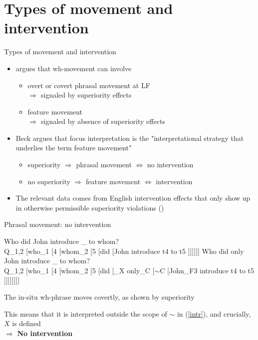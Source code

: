 \documentclass[11pt,final,hyperref={pdfpagelabels=false}]{beamer}
\begin{document}
\section{Types of movement and intervention}
\begin{frame}{Types of movement and intervention}

\begin{itemize}
\item \cite{Pes00} argues that wh-movement can involve
    \begin{itemize}
    	\item overt or covert phrasal movement at LF\\
	$\Rightarrow$ signaled by superiority effects
	
    \item feature movement \\
	$\Rightarrow$ signaled by absence of superiority effects
    \end{itemize}
\item Beck argues that focus interpretation is the "interpretational strategy that underlies the term feature movement"
    \begin{itemize}
    \item superiority $\Rightarrow$ phrasal movement $\Leftrightarrow$ no intervention 
    \item no superiority $\Rightarrow$ feature movement $\Leftrightarrow$ intervention 
    \end{itemize}
\item The relevant data comes from English intervention effects that only show up in otherwise permissible superiority violations (\cite{Pes00})


\end{itemize}

\end{frame}







\begin{frame}{Phrasal movement: no intervention}

	\begin{exe}
		\ex Who did John introduce \_ to whom? \\
		{\footnotesize{Q_{1,2} [who_{1} [4 [whom_{2} [5 [did [John introduce t4 to t5 ]]]]]]}}
		\ex\label{a} Who did only John introduce \_ to whom? \\
		{\scriptsize{Q_{1,2} [who_{1} [4 [whom_{2} [5 [did [_{X} only_{C} [$\sim$C [John_{F3} introduce t4 to t5 ]]]]]]]]}}\label{intr}
	\end{exe}
	
The in-situ wh-phrase moves covertly, as shown by superiority 
    \begin{exe}
    \end{exe}
This means that it is interpreted outside the scope of $\sim$ in (\ref{intr}), and crucially, $X$ is defined\\ $\Rightarrow$ \textbf{No intervention}
\end{frame}
\end{document}
